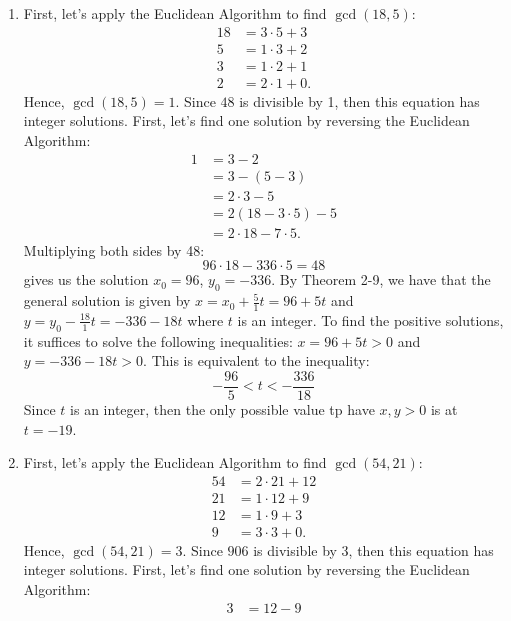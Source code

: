 \begin{solution}
    \begin{enumerate}
        \item First, let's apply the Euclidean Algorithm to find $\gcd(18, 5)$:
        \begin{align*}
            18 &= 3\cdot 5 + 3 \\
            5 &= 1 \cdot 3 + 2 \\
            3 &= 1\cdot 2 + 1 \\
            2 &= 2 \cdot 1 + 0.
        \end{align*}
        Hence, $\gcd(18, 5) = 1$. Since $48$ is divisible by 1, then this equation has integer solutions. First, let's find one solution by reversing the Euclidean Algorithm:
        \begin{align*}
            1 &= 3 - 2 \\
            &= 3 - (5 - 3) \\
            &= 2 \cdot 3 - 5 \\
            &= 2(18 - 3\cdot 5) - 5 \\
            &= 2\cdot 18 - 7\cdot 5.
        \end{align*}
        Multiplying both sides by 48:
        $$96 \cdot 18 - 336 \cdot 5 = 48$$
        gives us the solution $x_0 = 96$, $y_0 = -336$. By Theorem 2-9, we have that the general solution is given by $x = x_0 + \frac{5}{1}t = 96 + 5t$ and $y = y_0 - \frac{18}{1}t = -336 - 18t$ where $t$ is an integer. To find the positive solutions, it suffices to solve the following inequalities: $x = 96 + 5t > 0$ and $y = -336 - 18t > 0$. This is equivalent to the inequality:
        $$-\frac{96}{5} < t < -\frac{336}{18}$$
        Since $t$ is an integer, then the only possible value tp have $x,y > 0$ is at $t = -19$.
        \item First, let's apply the Euclidean Algorithm to find $\gcd(54, 21)$:
        \begin{align*}
            54 &= 2\cdot 21 + 12 \\
            21 &= 1 \cdot 12 + 9 \\
            12 &= 1\cdot 9 + 3 \\
            9 &= 3 \cdot 3 + 0.
        \end{align*}
        Hence, $\gcd(54, 21) = 3$. Since $906$ is divisible by 3, then this equation has integer solutions. First, let's find one solution by reversing the Euclidean Algorithm:
        \begin{align*}
            3 &= 12 - 9 \\

\end{align*}
\end{enumerate}
\end{solution}
